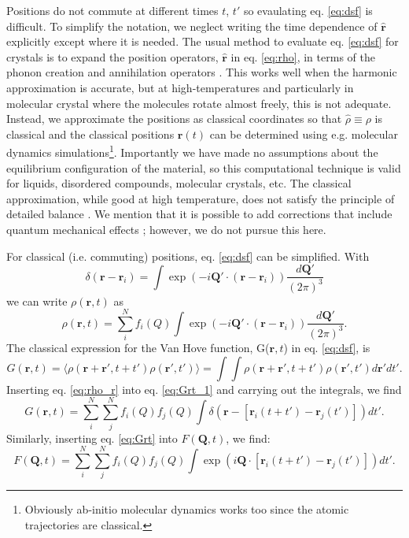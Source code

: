 \documentclass[11pt,prb,aps,nofootinbib,superscriptaddress,floatfix]{revtex4-2}
\begin{document}
Positions do not commute at different times $t$, $t'$ so evaulating eq. \ref{eq:dsf} is difficult. To simplify the notation, we neglect writing the time dependence of $\hat{\bm{r}}$ explicitly except where it is needed. The usual method to evaluate eq. \ref{eq:dsf} for crystals is to expand the position operators, $\hat{\bm{r}}$ in eq. \ref{eq:rho}, in terms of the phonon creation and annihilation operators \cite{squires1996introduction}. This works well when the harmonic approximation is accurate, but at high-temperatures and particularly in molecular crystal where the molecules rotate almost freely, this is not adequate. Instead, we approximate the positions as classical coordinates so that $\hat{\rho} \equiv \rho$ is classical and the classical positions $\bm{r}(t)$ can be determined using e.g. molecular dynamics simulations\footnote{Obviously ab-initio molecular dynamics works too since the atomic trajectories are classical.}. Importantly we have made no assumptions about the equilibrium configuration of the material, so this computational technique is valid for liquids, disordered compounds, molecular crystals, etc. The classical approximation, while good at high temperature, does not satisfy the principle of detailed balance \cite{squires1996introduction,dove1993introduction,harrelson2021computing}. We mention that it is possible to add corrections that include quantum mechanical effects \cite{harrelson2021computing}; however, we do not pursue this here. 

For classical (i.e. commuting) positions, eq. \ref{eq:dsf} can be simplified. With
\begin{equation}
    \delta(\bm{r}-\bm{r}_i)=\int{\exp(-i\bm{Q}'\cdot(\bm{r}-\bm{r}_i))}\frac{d\bm{Q}'}{(2\pi)^3}
\end{equation}
we can write $\rho(\bm{r},t)$ as
\begin{equation}
    \rho(\bm{r},t)=\sum_i^N f_i(Q)\int{\exp(-i\bm{Q}'\cdot(\bm{r}-\bm{r}_i))} \frac{d\bm{Q}'}{(2\pi)^3}.
    \label{eq:rho_r}
\end{equation}
The classical expression for the Van Hove function, G($\bm{r},t$) in eq. \ref{eq:dsf}, is
\begin{equation}
    G(\bm{r},t) = \langle \rho (\bm{r}+\bm{r}',t+t') \rho (\bm{r}',t') \rangle = \int \int \rho (\bm{r}+\bm{r}',t+t') \rho (\bm{r}',t') d\bm{r}'dt'.
    \label{eq:Grt_1}
\end{equation}
Inserting eq. \ref{eq:rho_r} into eq. \ref{eq:Grt_1} and carrying out the integrals, we find
\begin{equation}
    G(\bm{r},t)=\sum_i^N \sum_j^N f_i(Q) f_j(Q) \int  \delta(\bm{r}- \left[ \bm{r}_i(t+t')-\bm{r}_j(t') \right] ) dt' .
    \label{eq:Grt}
\end{equation}
Similarly, inserting eq. \ref{eq:Grt} into $F(\bm{Q},t)$, we find:
\begin{equation}
    F(\bm{Q},t) = \sum_i^N \sum_j^N f_i(Q) f_j(Q) \int \exp (i\bm{Q}\cdot \left[ \bm{r}_i(t+t')-\bm{r}_j(t') \right] ) dt'.
    \label{eq:FQt}
\end{equation}
\end{document}
